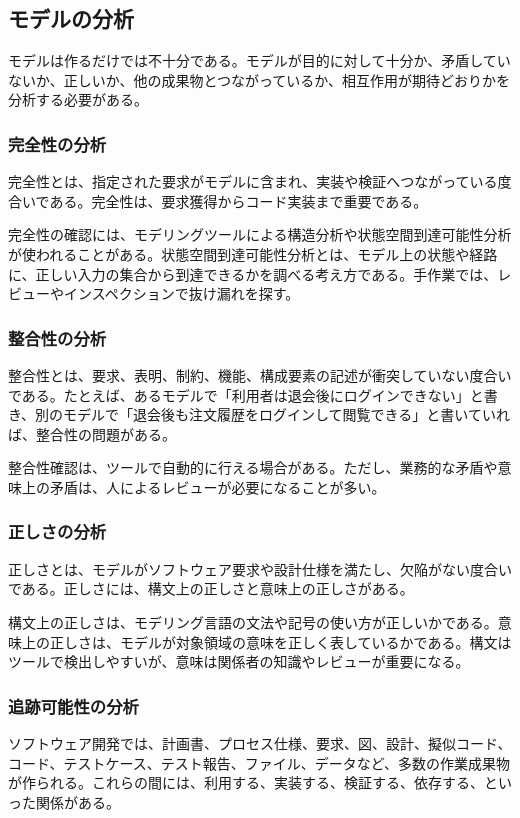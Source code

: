 \subsection{モデルの分析}
モデルは作るだけでは不十分である。モデルが目的に対して十分か、矛盾していないか、正しいか、他の成果物とつながっているか、相互作用が期待どおりかを分析する必要がある。

\subsubsection{完全性の分析}
完全性とは、指定された要求がモデルに含まれ、実装や検証へつながっている度合いである。完全性は、要求獲得からコード実装まで重要である。

完全性の確認には、モデリングツールによる構造分析や状態空間到達可能性分析が使われることがある。状態空間到達可能性分析とは、モデル上の状態や経路に、正しい入力の集合から到達できるかを調べる考え方である。手作業では、レビューやインスペクションで抜け漏れを探す。

\subsubsection{整合性の分析}
整合性とは、要求、表明、制約、機能、構成要素の記述が衝突していない度合いである。たとえば、あるモデルで「利用者は退会後にログインできない」と書き、別のモデルで「退会後も注文履歴をログインして閲覧できる」と書いていれば、整合性の問題がある。

整合性確認は、ツールで自動的に行える場合がある。ただし、業務的な矛盾や意味上の矛盾は、人によるレビューが必要になることが多い。

\subsubsection{正しさの分析}
正しさとは、モデルがソフトウェア要求や設計仕様を満たし、欠陥がない度合いである。正しさには、構文上の正しさと意味上の正しさがある。

構文上の正しさは、モデリング言語の文法や記号の使い方が正しいかである。意味上の正しさは、モデルが対象領域の意味を正しく表しているかである。構文はツールで検出しやすいが、意味は関係者の知識やレビューが重要になる。

\subsubsection{追跡可能性の分析}
ソフトウェア開発では、計画書、プロセス仕様、要求、図、設計、擬似コード、コード、テストケース、テスト報告、ファイル、データなど、多数の作業成果物が作られる。これらの間には、利用する、実装する、検証する、依存する、といった関係がある。

